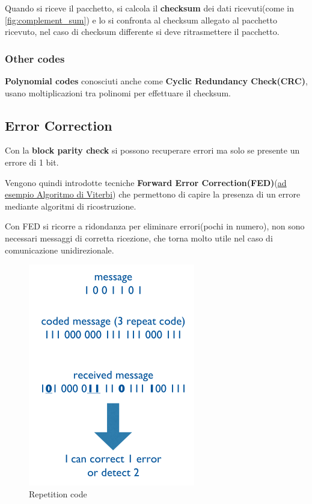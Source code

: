Quando si riceve il pacchetto, si calcola il \textbf{checksum} dei dati ricevuti(come in \autoref{fig:complement_sum})
e lo si confronta al checksum allegato al pacchetto ricevuto,
nel caso di checksum differente si deve ritrasmettere il pacchetto.

\subsubsection{Other codes}

\textbf{Polynomial codes} conosciuti anche come \textbf{Cyclic Redundancy Check(CRC)},
usano moltiplicazioni tra polinomi per effettuare il checksum.



\subsection{Error Correction}



Con la \textbf{block parity check} si possono recuperare errori ma solo se presente un errore di 1 bit.

Vengono quindi introdotte tecniche \textbf{Forward Error Correction(FED)}(\href{https://en.wikipedia.org/wiki/Viterbi_algorithm}{ad esempio Algoritmo di Viterbi})
che permettono di capire la presenza di un errore mediante algoritmi di ricostruzione.

Con FED si ricorre a ridondanza per eliminare errori(pochi in numero), non sono necessari messaggi
di corretta ricezione, che torna molto utile nel caso di comunicazione unidirezionale.


\begin{figure}[!ht]
	\centering
	\includegraphics[width=0.4\columnwidth]{./images/repetition_code.png}
	\caption{Repetition code}
	\label{fig_repetition_code}
\end{figure}



